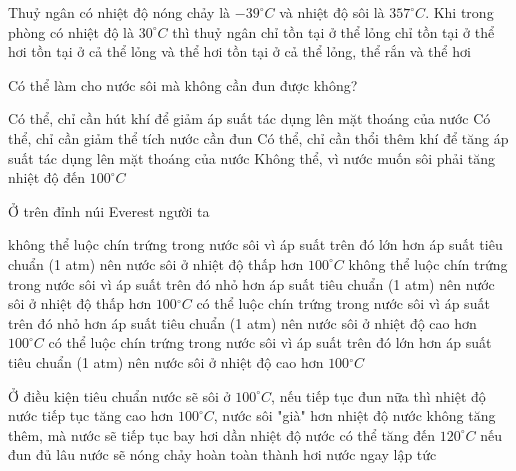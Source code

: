 \begin{ex}
	Thuỷ ngân có nhiệt độ nóng chảy là $-39^\circ C$ và nhiệt độ sôi là $357^\circ C$. Khi trong phòng có nhiệt độ là $30^\circ C$ thì thuỷ ngân
	\choice
	{chỉ tồn tại ở thể lỏng}
	{chỉ tồn tại ở thể hơi}
	{\True tồn tại ở cả thể lỏng và thể hơi}
	{tồn tại ở cả thể lỏng, thể rắn và thể hơi}
	\end{ex}
\begin{ex}
	Có thể làm cho nước sôi mà không cần đun được không?
	
	\choice
	{\True Có thể, chỉ cần hút khí để giảm áp suất tác dụng lên mặt thoáng của nước}
	{Có thể, chỉ cần giảm thể tích nước cần đun}
	{Có thể, chỉ cần thổi thêm khí để tăng áp suất tác dụng lên mặt thoáng của nước}
	{Không thể, vì nước muốn sôi phải tăng nhiệt độ đến $100^\circ C$}
	\end{ex}
\begin{ex}
	Ở trên đỉnh núi Everest người ta
	
	\choice
	{không thể luộc chín trứng trong nước sôi vì áp suất trên đó lớn hơn áp suất tiêu chuẩn (1 atm) nên nước sôi ở nhiệt độ thấp hơn $100^\circ C$}
	{\True không thể luộc chín trứng trong nước sôi vì áp suất trên đó nhỏ hơn áp suất tiêu chuẩn (1 atm) nên nước sôi ở nhiệt độ thấp hơn $100{}^\circ C$}
	{có thể luộc chín trứng trong nước sôi vì áp suất trên đó nhỏ hơn áp suất tiêu chuẩn (1 atm) nên nước sôi ở nhiệt độ cao hơn $100^\circ C$}
	{có thể luộc chín trứng trong nước sôi vì áp suất trên đó lớn hơn áp suất tiêu chuẩn (1 atm) nên nước sôi ở nhiệt độ cao hơn $100{}^\circ C$}
	\end{ex}


\begin{ex} 
	Ở điều kiện tiêu chuẩn nước sẽ sôi ở $100^\circ C$, nếu tiếp tục đun nữa thì 
	\choice
	{nhiệt độ nước tiếp tục tăng cao hơn $100^\circ C$, nước sôi "già" hơn}
	{\True nhiệt độ nước không tăng thêm, mà nước sẽ tiếp tục bay hơi dần}
	{nhiệt độ nước có thể tăng đến $120^\circ C$ nếu đun đủ lâu}
	{nước sẽ nóng chảy hoàn toàn thành hơi nước ngay lập tức}
\end{ex}





